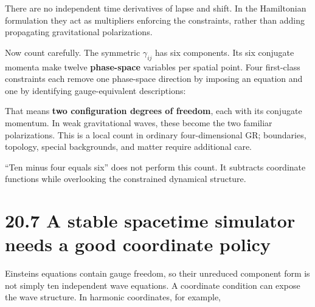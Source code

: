 \documentclass[
  11pt,
  letterpaper,
  oneside,
  openany]{scrbook}
\begin{document}
There are no independent time derivatives of lapse and shift. In the
Hamiltonian formulation they act as multipliers enforcing the
constraints, rather than adding propagating gravitational polarizations.

Now count carefully. The symmetric \(\gamma_{ij}\) has six components.
Its six conjugate momenta make twelve \textbf{phase-space} variables per
spatial point. Four first-class constraints each remove one phase-space
direction by imposing an equation and one by identifying
gauge-equivalent descriptions:

\begin{center}
\begingroup
{}
\ifdim\wd\grmathbox>\linewidth
\resizebox{\linewidth}{!}{\usebox{\grmathbox}}
\else\usebox{\grmathbox}\fi
\endgroup
\end{center}

That means \textbf{two configuration degrees of freedom}, each with its
conjugate momentum. In weak gravitational waves, these become the two
familiar polarizations. This is a local count in ordinary
four-dimensional GR; boundaries, topology, special backgrounds, and
matter require additional care.

``Ten minus four equals six'' does not perform this count. It subtracts
coordinate functions while overlooking the constrained dynamical
structure.

\hypertarget{a-stable-spacetime-simulator-needs-a-good-coordinate-policy}{%
\section{20.7 A stable spacetime simulator needs a good coordinate
policy}\label{a-stable-spacetime-simulator-needs-a-good-coordinate-policy}}

Einstein\textquotesingle s equations contain gauge freedom, so their
unreduced component form is not simply ten independent wave equations. A
coordinate condition can expose the wave structure. In harmonic
coordinates, for example,

\begin{center}
\begingroup
{}
\ifdim\wd\grmathbox>\linewidth
\resizebox{\linewidth}{!}{\usebox{\grmathbox}}
\else\usebox{\grmathbox}\fi
\endgroup
\end{center}
\end{document}
